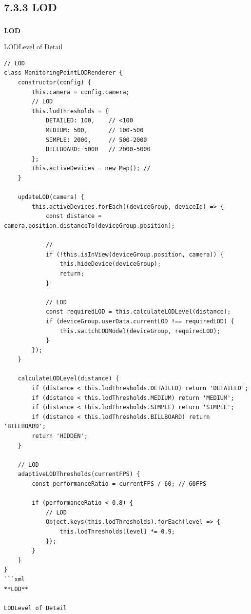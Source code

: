 \subsection{7.3.3 LOD}\label{lod}

\subsubsection{}\label{section-38}

\textbf{LOD}

LODLevel of Detail

\begin{verbatim}
// LOD
class MonitoringPointLODRenderer {
    constructor(config) {
        this.camera = config.camera;
        // LOD
        this.lodThresholds = {
            DETAILED: 100,    // <100
            MEDIUM: 500,      // 100-500
            SIMPLE: 2000,     // 500-2000
            BILLBOARD: 5000   // 2000-5000
        };
        this.activeDevices = new Map(); // 
    }
    
    updateLOD(camera) {
        this.activeDevices.forEach((deviceGroup, deviceId) => {
            const distance = camera.position.distanceTo(deviceGroup.position);
            
            // 
            if (!this.isInView(deviceGroup.position, camera)) {
                this.hideDevice(deviceGroup);
                return;
            }
            
            // LOD
            const requiredLOD = this.calculateLODLevel(distance);
            if (deviceGroup.userData.currentLOD !== requiredLOD) {
                this.switchLODModel(deviceGroup, requiredLOD);
            }
        });
    }
    
    calculateLODLevel(distance) {
        if (distance < this.lodThresholds.DETAILED) return 'DETAILED';
        if (distance < this.lodThresholds.MEDIUM) return 'MEDIUM';
        if (distance < this.lodThresholds.SIMPLE) return 'SIMPLE';
        if (distance < this.lodThresholds.BILLBOARD) return 'BILLBOARD';
        return 'HIDDEN';
    }
    
    // LOD
    adaptiveLODThresholds(currentFPS) {
        const performanceRatio = currentFPS / 60; // 60FPS
        
        if (performanceRatio < 0.8) {
            // LOD
            Object.keys(this.lodThresholds).forEach(level => {
                this.lodThresholds[level] *= 0.9;
            });
        }
    }
}
```xml
**LOD**

LODLevel of Detail


\end{verbatim}
